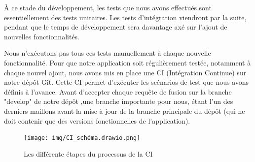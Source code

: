 \documentclass[12pt]{article}
\begin{document}
\justify
 À ce stade du développement, les tests que nous avons effectués sont essentiellement des tests unitaires. Les tests d'intégration viendront par la suite, pendant que le temps de développement sera davantage axé sur l'ajout de nouvelles fonctionnalités.

\justify
\text Nous n'exécutons pas tous ces tests manuellement à chaque nouvelle fonctionnalité. Pour que notre application soit régulièrement testée, notamment à chaque nouvel ajout, nous avons mis en place une CI (Intégration Continue) sur notre dépôt Git. Cette CI permet d'exécuter les scénarios de test que nous avons définis à l'avance. Avant d'accepter chaque requête de fusion sur la branche "develop" de notre dépôt ,une branche importante pour nous, étant l'un des derniers maillons avant la mise à jour de la branche principale du dépôt (qui ne doit contenir que des versions fonctionnelles de l'application).

\begin{figure}[H]
    \centering
    \texttt{[image: img/CI\_schéma.drawio.png]}
    \caption{Les différente étapes du processus de la CI}
    \label{fig:enter-label}
\end{figure}
\end{document}
